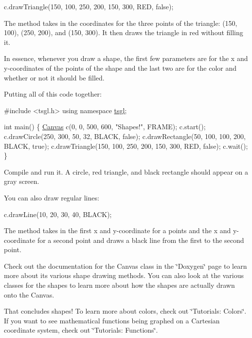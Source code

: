 \begin{DoxyCode}
c.drawTriangle(150, 100, 250, 200, 150, 300, RED, \textcolor{keyword}{false});
\end{DoxyCode}


The method takes in the coordinates for the three points of the triangle\+: (150, 100), (250, 200), and (150, 300). It then draws the triangle in red without filling it.

In essence, whenever you draw a shape, the first few parameters are for the x and y-\/coordinates of the points of the shape and the last two are for the color and whether or not it should be filled.

Putting all of this code together\+: 
\begin{DoxyCode}
\textcolor{preprocessor}{#include <tsgl.h>}
\textcolor{keyword}{using namespace }\hyperlink{namespacetsgl}{tsgl};

\textcolor{keywordtype}{int} main() \{
  \hyperlink{classtsgl_1_1_canvas}{Canvas} c(0, 0, 500, 600, \textcolor{stringliteral}{"Shapes!"}, FRAME);
  c.start();
  c.drawCircle(250, 300, 50, 32, BLACK, \textcolor{keyword}{false});
  c.drawRectangle(50, 100, 100, 200, BLACK, \textcolor{keyword}{true});
  c.drawTriangle(150, 100, 250, 200, 150, 300, RED, \textcolor{keyword}{false});
  c.wait();
\}
\end{DoxyCode}


Compile and run it. A circle, red triangle, and black rectangle should appear on a gray screen.

You can also draw regular lines\+:


\begin{DoxyCode}
c.drawLine(10, 20, 30, 40, BLACK);
\end{DoxyCode}


The method takes in the first x and y-\/coordinate for a points and the x and y-\/coordinate for a second point and draws a black line from the first to the second point.

Check out the documentation for the Canvas class in the \char`\"{}\+Doxygen\char`\"{} page to learn more about its various shape drawing methods. You can also look at the various classes for the shapes to learn more about how the shapes are actually drawn onto the Canvas.

That concludes shapes! To learn more about colors, check out \char`\"{}\+Tutorials\+: Colors\char`\"{}. If you want to see mathematical functions being graphed on a Cartesian coordinate system, check out \char`\"{}\+Tutorials\+: Functions\char`\"{}. 